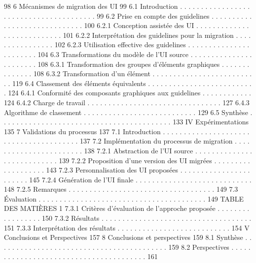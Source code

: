 \documentclass{article}
\begin{document}
98
6
Mécanismes de migration des UI
99
6.1
Introduction . . . . . . . . . . . . . . . . . . . . . . . . . . . . . . . . . . . . . . .
99
6.2
Prise en compte des guidelines . . . . . . . . . . . . . . . . . . . . . . . . . . . . .
100
6.2.1
Conception assistée des UI . . . . . . . . . . . . . . . . . . . . . . . . . . .
101
6.2.2
Interprétation des guidelines pour la migration
. . . . . . . . . . . . . . . .
102
6.2.3
Utilisation effective des guidelines . . . . . . . . . . . . . . . . . . . . . . .
104
6.3
Transformations du modèle de l’UI source . . . . . . . . . . . . . . . . . . . . . . .
108
6.3.1
Transformation des groupes d’éléments graphiques . . . . . . . . . . . . . .
108
6.3.2
Transformation d’un élément . . . . . . . . . . . . . . . . . . . . . . . . . .
119
6.4
Classement des éléments équivalents . . . . . . . . . . . . . . . . . . . . . . . . . .
124
6.4.1
Conformité des composants graphiques aux guidelines . . . . . . . . . . . .
124
6.4.2
Charge de travail . . . . . . . . . . . . . . . . . . . . . . . . . . . . . . . .
127
6.4.3
Algorithme de classement
. . . . . . . . . . . . . . . . . . . . . . . . . . .
129
6.5
Synthèse . . . . . . . . . . . . . . . . . . . . . . . . . . . . . . . . . . . . . . . . .
133
IV
Expérimentations
135
7
Validations du processus
137
7.1
Introduction . . . . . . . . . . . . . . . . . . . . . . . . . . . . . . . . . . . . . . .
137
7.2
Implémentation du processus de migration . . . . . . . . . . . . . . . . . . . . . . .
138
7.2.1
Abstraction de l’UI source . . . . . . . . . . . . . . . . . . . . . . . . . . .
139
7.2.2
Proposition d’une version des UI migrées . . . . . . . . . . . . . . . . . . .
143
7.2.3
Personnalisation des UI proposées . . . . . . . . . . . . . . . . . . . . . . .
145
7.2.4
Génération de l’UI ﬁnale . . . . . . . . . . . . . . . . . . . . . . . . . . . .
148
7.2.5
Remarques . . . . . . . . . . . . . . . . . . . . . . . . . . . . . . . . . . .
149
7.3
Évaluation . . . . . . . . . . . . . . . . . . . . . . . . . . . . . . . . . . . . . . . .
149
TABLE DES MATIÈRES
1
7.3.1
Critères d’évaluation de l’approche proposée
. . . . . . . . . . . . . . . . .
150
7.3.2
Résultats
. . . . . . . . . . . . . . . . . . . . . . . . . . . . . . . . . . . .
151
7.3.3
Interprétation des résultats . . . . . . . . . . . . . . . . . . . . . . . . . . .
154
V
Conclusions et Perspectives
157
8
Conclusions et perspectives
159
8.1
Synthèse . . . . . . . . . . . . . . . . . . . . . . . . . . . . . . . . . . . . . . . . .
159
8.2
Perspectives . . . . . . . . . . . . . . . . . . . . . . . . . . . . . . . . . . . . . . .
161
\end{document}
